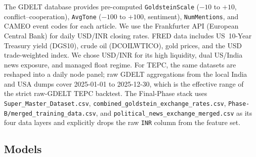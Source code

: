 \documentclass[11pt]{article}
\begin{document}
\begin{sloppypar}
The GDELT database provides pre-computed \texttt{Goldstein\-Scale} ($-10$ to $+10$, conflict--cooperation), \texttt{Avg\-Tone} ($-100$ to $+100$, sentiment), \texttt{Num\-Mentions}, and CAMEO event codes for each article.
We use the Frankfurter API (European Central Bank) for daily USD/INR closing rates.
FRED data includes US~10-Year Treasury yield (DGS10), crude oil (DCOILWTICO), gold prices, and the USD trade-weighted index.
We chose USD/INR for its high liquidity, dual US/India news exposure, and managed float regime.
For TEPC, the same datasets are reshaped into a daily node panel; raw GDELT aggregations from the local India and USA dumps cover \mbox{2025-01-01} to \mbox{2025-12-30}, which is the effective range of the strict raw-GDELT TEPC backtest. The Final-Phase stack uses \texttt{Super\_Master\_Dataset.csv}, \texttt{combined\_goldstein\_exchange\_rates.csv}, \texttt{Phase-B/merged\_training\_data.csv}, and \texttt{political\_news\_exchange\_merged.csv} as its four data layers and explicitly drops the raw \texttt{INR} column from the feature set.
\end{sloppypar}

\subsection{Models}
\end{document}
